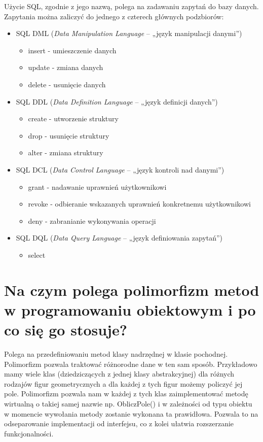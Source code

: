 \documentclass[12pt,a4paper]{article}
\begin{document}
	Użycie SQL, zgodnie z jego nazwą, polega na zadawaniu zapytań do bazy danych. Zapytania można zaliczyć do jednego z czterech głównych podzbiorów:
	\begin{itemize}
		\item SQL DML (\textit{Data Manipulation Language} – „język manipulacji danymi”)
			\begin{itemize}
				\item insert - umieszczenie danych
				\item update - zmiana danych
				\item delete - usunięcie danych
			\end{itemize}
		\item SQL DDL (\textit{Data Definition Language} – „język definicji danych”)
			\begin{itemize}
				\item create - utworzenie struktury
				\item drop - usunięcie struktury
				\item alter - zmiana struktury
			\end{itemize}
		\item SQL DCL (\textit{Data Control Language} – „język kontroli nad danymi”)
			\begin{itemize}
				\item grant - nadawanie uprawnień użytkownikowi 
				\item revoke - odbieranie wskazanych uprawnień konkretnemu użytkownikowi
				\item deny - zabranianie wykonywania operacji
			\end{itemize}
		\item SQL DQL (\textit{Data Query Language} – „język definiowania zapytań”)
			\begin{itemize}
				\item select
			\end{itemize}
	\end{itemize}

	\section{Na czym polega polimorfizm metod w programowaniu obiektowym i po co się go stosuje?}
	Polega na przedefiniowaniu metod klasy nadrzędnej w klasie pochodnej. Polimorfizm pozwala traktować różnorodne dane w ten sam sposób. Przykładowo mamy wiele klas (dziedziczących z jednej klasy abstrakcyjnej) dla różnych rodzajów figur geometrycznych a dla każdej z tych figur możemy policzyć jej pole. Polimorfizm pozwala nam w każdej z tych klas zaimplementować metodę wirtualną o takiej samej nazwie np. ObliczPole() i w zależności od typu obiektu w momencie wywołania metody zostanie wykonana ta prawidłowa. Pozwala to na odseparowanie implementacji od interfejsu, co z kolei ułatwia rozszerzanie funkcjonalności.
\end{document}

